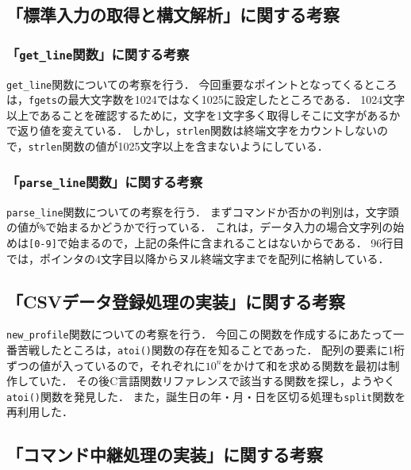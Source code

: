 \documentclass[autodetect-engine,dvi=dvipdfmx,ja=standard,
               a4j,11pt]{bxjsarticle}
\begin{document}
\subsection{「標準入力の取得と構文解析」に関する考察}

\subsubsection{「\texttt{get\_line}関数」に関する考察}

\verb|get_line|関数についての考察を行う．
今回重要なポイントとなってくるところは，\verb|fgets|の最大文字数を1024ではなく1025に設定したところである．
1024文字以上であることを確認するために，文字を1文字多く取得しそこに文字があるかで返り値を変えている．
しかし，\verb|strlen|関数は終端文字をカウントしないので，\verb|strlen|関数の値が1025文字以上を含まないようにしている．

\subsubsection{「\texttt{parse\_line}関数」に関する考察}

\verb|parse_line|関数についての考察を行う．
まずコマンドか否かの判別は，文字頭の値が\verb|%|で始まるかどうかで行っている．
これは，データ入力の場合文字列の始めは\verb|[0-9]|で始まるので，上記の条件に含まれることはないからである．
96行目では，ポインタの4文字目以降からヌル終端文字までを配列に格納している．

\subsection{「CSVデータ登録処理の実装」に関する考察}

\verb|new_profile|関数についての考察を行う．
今回この関数を作成するにあたって一番苦戦したところは，\verb|atoi()|関数の存在を知ることであった．
配列の要素に1桁ずつの値が入っているので，それぞれに$10^n$をかけて和を求める関数を最初は制作していた．
その後C言語関数リファレンスで該当する関数を探し，ようやく\verb|atoi()|関数を発見した．
また，誕生日の年・月・日を区切る処理も\verb|split|関数を再利用した．

\subsection{「コマンド中継処理の実装」に関する考察}
\end{document}
